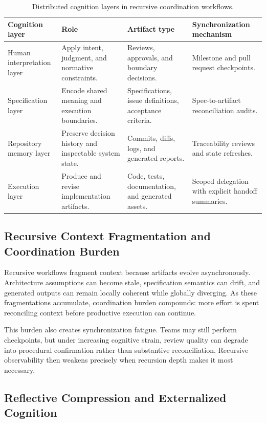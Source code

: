 \begin{table}[H]
  \centering
  \small
  \caption{Distributed cognition layers in recursive coordination workflows.}
  \label{tab:distributed-cognition-layers}
  \begin{tabularx}{\linewidth}{l X X X}
    \toprule
    \textbf{Cognition layer} & \textbf{Role} & \textbf{Artifact type} & \textbf{Synchronization mechanism} \\
    \midrule
    Human interpretation layer & Apply intent, judgment, and normative constraints. & Reviews, approvals, and boundary decisions. & Milestone and pull request checkpoints. \\
    Specification layer & Encode shared meaning and execution boundaries. & Specifications, issue definitions, acceptance criteria. & Spec-to-artifact reconciliation audits. \\
    Repository memory layer & Preserve decision history and inspectable system state. & Commits, diffs, logs, and generated reports. & Traceability reviews and state refreshes. \\
    Execution layer & Produce and revise implementation artifacts. & Code, tests, documentation, and generated assets. & Scoped delegation with explicit handoff summaries. \\
    \bottomrule
  \end{tabularx}
\end{table}

\subsection{Recursive Context Fragmentation and Coordination Burden}

Recursive workflows fragment context because artifacts evolve asynchronously. Architecture assumptions can become stale, specification semantics can drift, and generated outputs can remain locally coherent while globally diverging. As these fragmentations accumulate, coordination burden compounds: more effort is spent reconciling context before productive execution can continue.

This burden also creates synchronization fatigue. Teams may still perform checkpoints, but under increasing cognitive strain, review quality can degrade into procedural confirmation rather than substantive reconciliation. Recursive observability then weakens precisely when recursion depth makes it most necessary.

\subsection{Reflective Compression and Externalized Cognition}

